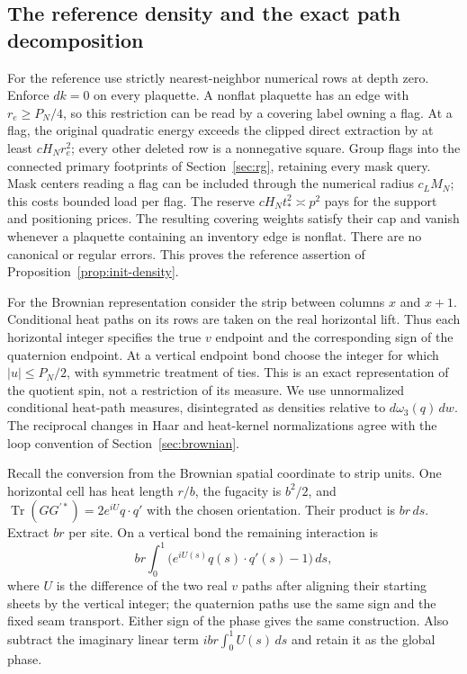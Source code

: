 \subsection{The reference density and the exact path decomposition}

For the reference use strictly nearest-neighbor numerical rows at depth
zero.  Enforce $dk=0$ on every plaquette.  A nonflat plaquette has an edge
with $r_e\ge P_N/4$, so this restriction can be read by a covering label
owning a flag.  At a flag, the original quadratic energy exceeds the
clipped direct extraction by at least $cH_Nr_e^2$; every other deleted
row is a nonnegative square.  Group flags into the connected primary
footprints of Section~\ref{sec:rg}, retaining every mask query.  Mask
centers reading a flag can be included through the numerical radius
$c_LM_N$; this costs bounded load per flag.  The reserve
$cH_Nt_*^2\asymp p^2$ pays for the support and positioning prices.
The resulting covering weights satisfy their cap and vanish whenever a
plaquette containing an inventory edge is nonflat.  There are no
canonical or regular errors.  This proves the reference assertion of
Proposition~\ref{prop:init-density}.

For the Brownian representation consider the strip between columns $x$
and $x+1$.  Conditional heat paths on its rows are taken on the real
horizontal lift.  Thus each horizontal integer specifies the true $v$
endpoint and the corresponding sign of the quaternion endpoint.  At a
vertical endpoint bond choose the integer for which $|u|\le P_N/2$,
with symmetric treatment of ties.  This is an exact representation of
the quotient spin, not a restriction of its measure.  We use unnormalized
conditional heat-path measures, disintegrated as densities relative to
$d\omega_3(q)\,dw$.  The reciprocal changes in Haar and heat-kernel
normalizations agree with the loop convention of
Section~\ref{sec:brownian}.

Recall the conversion from the Brownian spatial coordinate to strip units.
One horizontal cell has heat length $r/b$, the fugacity is $b^2/2$, and
$\operatorname{Tr}(G G^{\prime *})=2e^{iU}q\cdot q'$ with the chosen
orientation.  Their product is $br\,ds$.  Extract $br$ per site.
On a vertical bond the remaining interaction is
\begin{equation}
 br\int_0^1\bigl(e^{iU(s)}q(s)\cdot q'(s)-1\bigr)\,ds,
 \label{eq:init-vertical-potential}
\end{equation}
where $U$ is the difference of the two real $v$ paths after aligning their
starting sheets by the vertical integer; the quaternion paths use the
same sign and the fixed seam transport.  Either sign of the phase gives
the same construction.  Also subtract the imaginary linear term
$ibr\int_0^1U(s)\,ds$ and retain it as the global phase.

